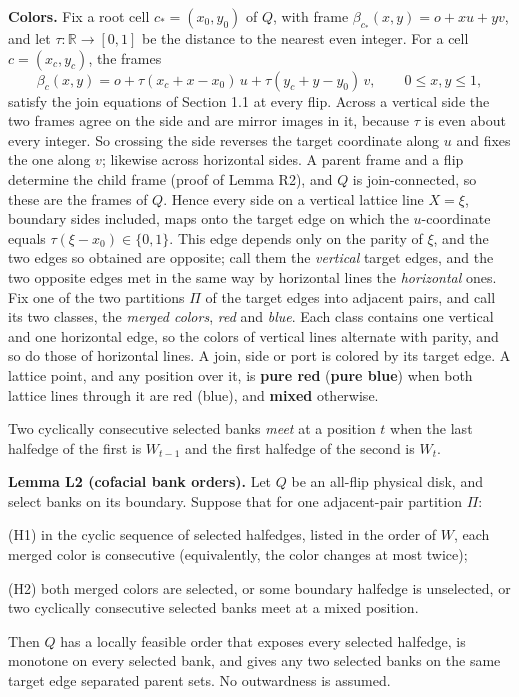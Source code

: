 \documentclass[
  11pt,
]{article}
\begin{document}
\textbf{Colors.} Fix a root cell \(c_\ast=(x_0,y_0)\) of \(Q\), with
frame \(\beta_{c_\ast}(x,y)=o+xu+yv\), and let
\(\tau:\mathbb R\to[0,1]\) be the distance to the nearest even integer.
For a cell \(c=(x_c,y_c)\), the frames \[
\beta_c(x,y)=o+\tau(x_c+x-x_0)\,u+\tau(y_c+y-y_0)\,v,\qquad 0\le x,y\le1,
\] satisfy the join equations of Section 1.1 at every flip. Across a
vertical side the two frames agree on the side and are mirror images in
it, because \(\tau\) is even about every integer. So crossing the side
reverses the target coordinate along \(u\) and fixes the one along
\(v\); likewise across horizontal sides. A parent frame and a flip
determine the child frame (proof of Lemma R2), and \(Q\) is
join-connected, so these are the frames of \(Q\). Hence every side on a
vertical lattice line \(X=\xi\), boundary sides included, maps onto the
target edge on which the \(u\)-coordinate equals
\(\tau(\xi-x_0)\in\{0,1\}\). This edge depends only on the parity of
\(\xi\), and the two edges so obtained are opposite; call them the
\emph{vertical} target edges, and the two opposite edges met in the same
way by horizontal lines the \emph{horizontal} ones. Fix one of the two
partitions \(\Pi\) of the target edges into adjacent pairs, and call its
two classes, the \emph{merged colors}, \emph{red} and \emph{blue}. Each
class contains one vertical and one horizontal edge, so the colors of
vertical lines alternate with parity, and so do those of horizontal
lines. A join, side or port is colored by its target edge. A lattice
point, and any position over it, is \textbf{pure red} (\textbf{pure
blue}) when both lattice lines through it are red (blue), and
\textbf{mixed} otherwise.

Two cyclically consecutive selected banks \emph{meet} at a position
\(t\) when the last halfedge of the first is \(W_{t-1}\) and the first
halfedge of the second is \(W_t\).

\textbf{Lemma L2 (cofacial bank orders).} Let \(Q\) be an all-flip
physical disk, and select banks on its boundary. Suppose that for one
adjacent-pair partition \(\Pi\):

(H1) in the cyclic sequence of selected halfedges, listed in the order
of \(W\), each merged color is consecutive (equivalently, the color
changes at most twice);

(H2) both merged colors are selected, or some boundary halfedge is
unselected, or two cyclically consecutive selected banks meet at a mixed
position.

Then \(Q\) has a locally feasible order that exposes every selected
halfedge, is monotone on every selected bank, and gives any two selected
banks on the same target edge separated parent sets. No outwardness is
assumed.
\end{document}
